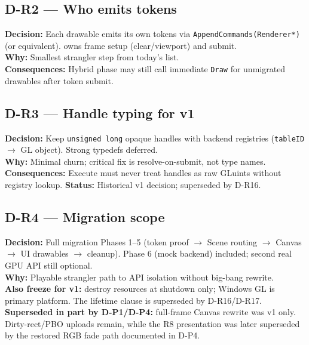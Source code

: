\subsection*{D-R2 --- Who emits tokens}
\begin{decisionbox}[title={D-R2 \quad 2026-07-28}]
\textbf{Decision:} Each drawable emits its own tokens via
\texttt{AppendCommands(Renderer*)} (or equivalent). 
owns frame setup (clear/viewport) and submit.\\
\textbf{Why:} Smallest strangler step from today's
 list.\\
\textbf{Consequences:} Hybrid phase may still call immediate \texttt{Draw}
for unmigrated drawables after token submit.
\end{decisionbox}

\subsection*{D-R3 --- Handle typing for v1}
\begin{decisionbox}[title={D-R3 \quad 2026-07-28}]
\textbf{Decision:} Keep \texttt{unsigned long} opaque handles with backend
registries (\texttt{tableID} $\rightarrow$ GL object). Strong typedefs deferred.\\
\textbf{Why:} Minimal churn; critical fix is resolve-on-submit, not type names.\\
\textbf{Consequences:} Execute must never treat handles as raw GLuints without
registry lookup.
\textbf{Status:} Historical v1 decision; superseded by D-R16.
\end{decisionbox}

\subsection*{D-R4 --- Migration scope}
\begin{decisionbox}[title={D-R4 \quad 2026-07-28}]
\textbf{Decision:} Full migration Phases 1--5 (token proof $\rightarrow$ Scene
routing $\rightarrow$ Canvas $\rightarrow$ UI drawables $\rightarrow$ cleanup).
Phase 6 (mock backend) included; second real GPU API still optional.\\
\textbf{Why:} Playable strangler path to API isolation without big-bang rewrite.\\
\textbf{Also freeze for v1:} destroy resources at shutdown only; Windows GL is
primary platform. The lifetime clause is superseded by D-R16/D-R17.\\
\textbf{Superseded in part by D-P1/D-P4:} full-frame Canvas rewrite was v1 only.
Dirty-rect/PBO uploads remain, while the R8 presentation was later superseded
by the restored RGB fade path documented in D-P4.
\end{decisionbox}

